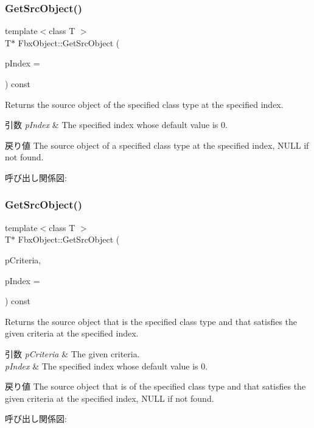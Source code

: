 \subsubsection{\texorpdfstring{Get\+Src\+Object()}{GetSrcObject()}\hspace{0.1cm}{\footnotesize\ttfamily [3/4]}}
{\footnotesize\ttfamily template$<$class T $>$ \\
T$\ast$ Fbx\+Object\+::\+Get\+Src\+Object (\begin{DoxyParamCaption}\item[{int}]{p\+Index = {} }\end{DoxyParamCaption}) const}

Returns the source object of the specified class type at the specified index. 
\begin{DoxyParams}{引数}
{\em p\+Index} & The specified index whose default value is 0. \\
\hline
\end{DoxyParams}
\begin{DoxyReturn}{戻り値}
The source object of a specified class type at the specified index, N\+U\+LL if not found. 
\end{DoxyReturn}
呼び出し関係図\+:
\mbox{\label{class_fbx_object_a8a4458e4c75a797792f25ccc9a0e5ae1}} 
\subsubsection{\texorpdfstring{Get\+Src\+Object()}{GetSrcObject()}\hspace{0.1cm}{\footnotesize\ttfamily [4/4]}}
{\footnotesize\ttfamily template$<$class T $>$ \\
T$\ast$ Fbx\+Object\+::\+Get\+Src\+Object (\begin{DoxyParamCaption}\item[{const \hyperlink{class_fbx_criteria}{Fbx\+Criteria} \&}]{p\+Criteria,  }\item[{int}]{p\+Index = {} }\end{DoxyParamCaption}) const}

Returns the source object that is the specified class type and that satisfies the given criteria at the specified index. 
\begin{DoxyParams}{引数}
{\em p\+Criteria} & The given criteria. \\
\hline
{\em p\+Index} & The specified index whose default value is 0. \\
\hline
\end{DoxyParams}
\begin{DoxyReturn}{戻り値}
The source object that is of the specified class type and that satisfies the given criteria at the specified index, N\+U\+LL if not found. 
\end{DoxyReturn}
呼び出し関係図\+:
\mbox{\label{class_fbx_object_a5fce56e85d5e0568243a5df99dabb42f}} 
